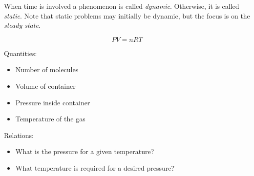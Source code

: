 \documentclass[letterpaper,12pt,fleqn]{article}
\begin{document}
When time is involved a phenomenon is called \emph{dynamic}.  Otherwise, it is called \emph{static}.  Note that
static problems may initially be dynamic, but the focus is on the \emph{steady state}.

\begin{example}
  \[PV=nRT\]

  Quantities:

  \begin{itemize}
  \item Number of molecules
  \item Volume of container
  \item Pressure inside container
  \item Temperature of the gas
  \end{itemize}

  Relations:

  \begin{itemize}
  \item What is the pressure for a given temperature?
  \item What temperature is required for a desired pressure?
  \end{itemize}
\end{example}
\end{document}
